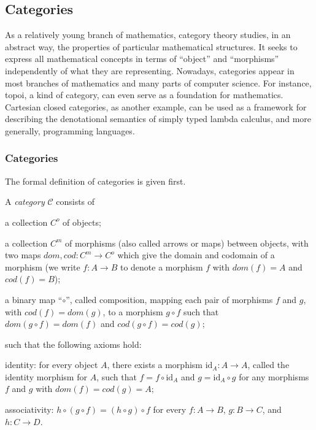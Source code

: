 \clearpage
\subsection{Categories}
\label{sec:bg_cat}
As a relatively young branch of mathematics, category theory studies, in an abstract way, the properties of particular mathematical structures. It seeks to express all mathematical concepts in terms of ``object'' and ``morphisms'' independently of what they are representing. Nowadays, categories appear in most branches of mathematics and many parts of computer science. For instance, topoi, a kind of category, can even serve as a foundation for mathematics. Cartesian closed categories, as another example, can be used as a framework for describing the denotational semantics of simply typed lambda calculus, and more generally, programming languages.


\subsubsection{Categories}
\label{sec:bg_cat_c}
The formal definition of categories is given first.
\begin{definition}
\label{definition:category}
A \emph{category} $ \mathcal{C} $ consists of
\begin{myitemize}
\item a collection $ C^o $ of objects;
\item a collection $ C^m $ of morphisms (also called arrows or maps) between objects, with two maps $ dom, cod : C^m \to C^o $ which give the domain and codomain of a morphism (we write $ f : A \to B $ to denote a morphism $ f $ with $ dom(f) = A $ and $ cod(f) = B $);
\item a binary map ``$ \circ $'', called composition, mapping each pair of morphisms $ f $ and $ g $, with $ cod(f) = dom(g) $, to a morphism $ g \circ f $ such that $ dom(g \circ f) = dom(f) $ and $ cod(g \circ f) = cod(g) $;
\end{myitemize}
such that the following axioms hold:
\begin{myitemize}
\item identity: for every object $ A $, there exists a morphism $ \text{id}_A : A \to A $, called the identity morphism for $ A $, such that $ f = f \circ \text{id}_A $ and $ g = \text{id}_A \circ g $ for any morphisms $ f $ and $ g $ with $ dom(f) = cod(g) = A $;
\item associativity: $ h \circ (g \circ f) = (h \circ g) \circ f $ for every $ f: A \to B $, $ g: B \to C$, and $ h: C \to D $.
\end{myitemize}
\end{definition}

